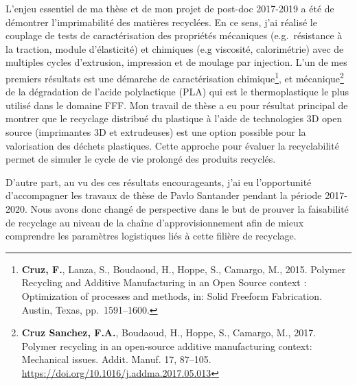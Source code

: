 \documentclass[
  11pt,
]{article}
\begin{document}
L'enjeu essentiel de ma thèse et de mon projet de post-doc 2017-2019 a
été de démontrer l'imprimabilité des matières recyclées. En ce sens,
j'ai réalisé le couplage de tests de caractérisation des propriétés
mécaniques (e.g.~résistance à la traction, module d'élasticité) et
chimiques (e.g viscosité, calorimétrie) avec de multiples cycles
d'extrusion, impression et de moulage par injection. L'un de mes
premiers résultats est une démarche de caractérisation
chimique\footnote{\textbf{Cruz, F.}, Lanza, S., Boudaoud, H., Hoppe, S.,
  Camargo, M., 2015. Polymer Recycling and Additive Manufacturing in an
  Open Source context : Optimization of processes and methods, in: Solid
  Freeform Fabrication. Austin, Texas, pp.~1591--1600.}, et
mécanique\footnote{\textbf{Cruz Sanchez, F.A.}, Boudaoud, H., Hoppe, S.,
  Camargo, M., 2017. Polymer recycling in an open-source additive
  manufacturing context: Mechanical issues. Addit. Manuf. 17, 87--105.
  \url{https://doi.org/10.1016/j.addma.2017.05.013}} de la dégradation
de l'acide polylactique (PLA) qui est le thermoplastique le plus utilisé
dans le domaine FFF. Mon travail de thèse a eu pour résultat principal
de montrer que le recyclage distribué du plastique à l'aide de
technologies 3D open source (imprimantes 3D et extrudeuses) est une
option possible pour la valorisation des déchets plastiques. Cette
approche pour évaluer la recyclabilité permet de simuler le cycle de vie
prolongé des produits recyclés.

D'autre part, au vu des ces résultats encourageants, j'ai eu
l'opportunité d'accompagner les travaux de thèse de Pavlo Santander
pendant la période 2017-2020. Nous avons donc changé de perspective dans
le but de prouver la faisabilité de recyclage au niveau de la chaîne
d'approvisionnement afin de mieux comprendre les paramètres logistiques
liés à cette filière de recyclage.
\end{document}
